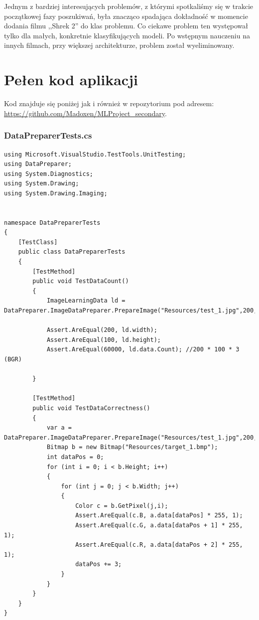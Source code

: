 \documentclass[12pt,a4paper]{article}
\begin{document}
    \par Jednym z bardziej interesujących problemów, z którymi spotkaliśmy się w trakcie początkowej fazy poszukiwań, była znacząco spadająca dokładność w momencie dodania filmu ,,Shrek 2'' do klas problemu. Co ciekawe problem ten występował tylko dla małych, konkretnie klasyfikujących modeli. Po wstępnym nauczeniu na innych filmach, przy większej architekturze, problem został wyeliminowany.
	
	
	\newpage
	\section*{Pełen kod aplikacji}
    \hspace{15pt} Kod znajduje się poniżej jak i również w repozytorium pod adresem: \\  \url{https://github.com/Madoxen/MLProject\_secondary}.
    
    


\subsubsection*{DataPreparerTests.cs}
\begin{lstlisting}
using Microsoft.VisualStudio.TestTools.UnitTesting;
using DataPreparer;
using System.Diagnostics;
using System.Drawing;
using System.Drawing.Imaging;


namespace DataPreparerTests
{
    [TestClass]
    public class DataPreparerTests
    {
        [TestMethod]
        public void TestDataCount()
        {
            ImageLearningData ld = DataPreparer.ImageDataPreparer.PrepareImage("Resources/test_1.jpg",200,100);

            Assert.AreEqual(200, ld.width);
            Assert.AreEqual(100, ld.height);
            Assert.AreEqual(60000, ld.data.Count); //200 * 100 * 3 (BGR)

        }

        [TestMethod]
        public void TestDataCorrectness()
        {
            var a = DataPreparer.ImageDataPreparer.PrepareImage("Resources/test_1.jpg",200,100);
            Bitmap b = new Bitmap("Resources/target_1.bmp");
            int dataPos = 0;
            for (int i = 0; i < b.Height; i++)
            {
                for (int j = 0; j < b.Width; j++)
                {
                    Color c = b.GetPixel(j,i);
                    Assert.AreEqual(c.B, a.data[dataPos] * 255, 1);
                    Assert.AreEqual(c.G, a.data[dataPos + 1] * 255, 1);
                    Assert.AreEqual(c.R, a.data[dataPos + 2] * 255, 1);
                    dataPos += 3;
                }
            }
        }
    }
}
\end{lstlisting}
\pagebreak
\end{document}
